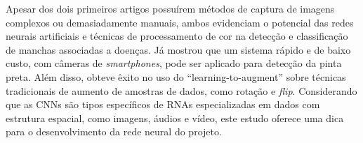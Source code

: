 Apesar dos dois primeiros artigos possuírem métodos de captura de imagens complexos ou demasiadamente manuais, ambos evidenciam o potencial das redes neurais artificiais e técnicas de processamento de cor na detecção e classificação de manchas associadas a doenças. Já \textcite{Momeny2022} mostrou que um sistema rápido e de baixo custo, com câmeras de \emph{smartphones}, pode ser aplicado para detecção da pinta preta. Além disso, obteve êxito no uso do “learning-to-augment” sobre técnicas tradicionais de aumento de amostras de dados, como rotação e \emph{flip}. Considerando que as CNNs são tipos específicos de RNAs especializadas em dados com estrutura espacial, como imagens, áudios e vídeo, este estudo oferece uma dica para o desenvolvimento da rede neural do projeto.